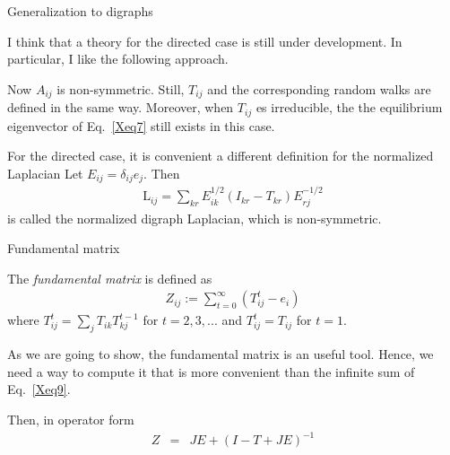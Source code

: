 \documentclass{beamer}
\begin{document}


\begin{frame}{Generalization to digraphs}

I think that a theory for the directed case is still under development.
In particular, I like the following approach.

\vspace{0.25cm}

Now $A_{ij}$ is non-symmetric. Still, $T_{ij}$ and the corresponding random walks are defined in the same way.
Moreover, when $T_{ij}$ es irreducible, the the equilibrium eigenvector of Eq.~\ref{Xeq7} still exists in this case.

\vspace{0.25cm}

For the directed case, it is convenient a different definition for the normalized Laplacian
Let $E_{ij} = \delta_{ij} e_j$.
Then
\begin{eqnarray}
\mathrm{L}_{ij}
=
\sum_{kr}
E^{1/2}_{ik}
(I_{kr}-T_{kr})
E^{-1/2}_{rj}
\end{eqnarray}
is called the normalized digraph Laplacian, which is non-symmetric.

\end{frame}


\begin{frame}{Fundamental matrix}

The {\em fundamental matrix} is defined as
\begin{eqnarray}
\label{Xeq9}
Z_{ij} 
:= 
\sum_{t=0}^{\infty}
(T_{ij}^t-e_i)
\end{eqnarray}
where $T_{ij}^t = \sum_j T_{ik} T_{kj}^{t-1}$ for $t=2,3,...$ and $T_{ij}^t = T_{ij}$ for $t=1$.

\vspace{0.25cm}

As we are going to show, the fundamental matrix is an useful tool. 
Hence, we need a way to compute it that is more convenient than the infinite sum of Eq.~\ref{Xeq9}.

\vspace{0.25cm}

Then, in operator form~\cite{yanhua2010random}
\begin{eqnarray}
Z
&=&
JE + (I-T+JE)^{-1}
\end{eqnarray}

\end{frame}
\end{document}
